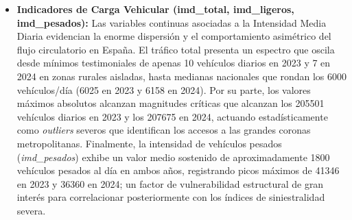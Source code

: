 \documentclass[twoside,a4paper,12pt,onecolumn,openany]{book}
\begin{document}
\begin{itemize}
    \item \textbf{Indicadores de Carga Vehicular (imd\_total, imd\_ligeros, imd\_pesados):} Las variables continuas asociadas a la Intensidad Media Diaria evidencian la enorme dispersión y el comportamiento asimétrico del flujo circulatorio en España. El tráfico total presenta un espectro que oscila desde mínimos testimoniales de apenas 10 vehículos diarios en 2023 y 7 en 2024 en zonas rurales aisladas, hasta medianas nacionales que rondan los 6000 vehículos/día (6025 en 2023 y 6158 en 2024). Por su parte, los valores máximos absolutos alcanzan magnitudes críticas que alcanzan los 205501 vehículos diarios en 2023 y los 207675 en 2024, actuando estadísticamente como \textit{outliers} severos que identifican los accesos a las grandes coronas metropolitanas. Finalmente, la intensidad de vehículos pesados (\textit{imd\_pesados}) exhibe un valor medio sostenido de aproximadamente 1800 vehículos pesados al día en ambos años, registrando picos máximos de 41346 en 2023 y 36360 en 2024; un factor de vulnerabilidad estructural de gran interés para correlacionar posteriormente con los índices de siniestralidad severa.
\end{itemize}
\end{document}
